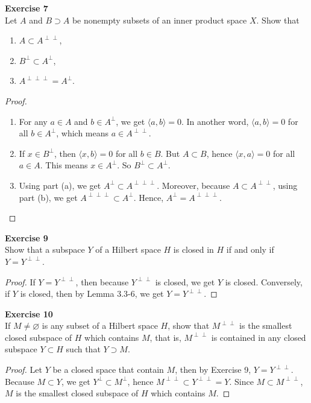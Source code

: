 \documentclass[12pt, a4paper]{article}
\theoremstyle{plain}
\newenvironment{exercise}[2][Exercise]
    { \begin{mdframed}[backgroundcolor=gray!20] \textbf{#1 #2} \\}
    {  \end{mdframed}}
\begin{document}
\begin{exercise}{7}
Let $A$ and $B\supset A$ be nonempty subsets of an inner product space $X$. Show that 
\begin{enumerate}[label=(\alph*)]
\item $A\subset A^{\perp\perp}$,
\item $B^\perp \subset A^\perp$,
\item $A^{\perp\perp\perp}=A^\perp$.
\end{enumerate}
\end{exercise}
	\begin{proof}
	\hfill
	\begin{enumerate}[label=(\alph*)]
	\item For any $a\in A$ and $b\in A^\perp$, we get $\langle{a,b}\rangle = 0$. In another word,  $\langle{a,b}\rangle = 0$ for all $b\in A^\perp$, which means $a\in A^{\perp\perp}$.
	\item If $x\in B^\perp$, then $\langle{x,b}\rangle=0$ for all $b\in B$. But $A\subset B$, hence $\langle{x,a}\rangle=0$ for all $a\in A$. This means $x\in A^\perp$. So $B^\perp\subset A^\perp$.
	\item Using part (a), we get $A^\perp\subset A^{\perp\perp\perp}$. Moreover, because $A\subset A^{\perp\perp}$, using part (b), we get $A^{\perp\perp\perp}\subset A^\perp$. Hence, $A^\perp=A^{\perp\perp\perp}$.
	\end{enumerate}
	\end{proof}
	
\begin{exercise}{9}
Show that a subspace $Y$ of a Hilbert space $H$ is closed in $H$ if and only if $Y=Y^{\perp\perp}$.
\end{exercise}
	\begin{proof}
	If $Y=Y^{\perp\perp}$, then because $Y^{\perp\perp}$ is closed, we get $Y$ is closed. 
	Conversely, if $Y$ is closed, then by Lemma 3.3-6, we get $Y=Y^{\perp\perp}$.
	\end{proof}

\begin{exercise}{10}
If $M\neq \varnothing$ is any subset of a Hilbert space $H$, show that $M^{\perp\perp}$ is the smallest closed subspace of $H$ which contains $M$, that is, $M^{\perp\perp}$ is contained in any closed subspace $Y\subset H$ such that $Y\supset M$.
\end{exercise}
	\begin{proof}
	Let $Y$ be a closed space that contain $M$, then by Exercise 9, $Y=Y^{\perp\perp}$. Because $M\subset Y$, we get $Y^\perp\subset M^\perp$, hence $M^{\perp\perp}\subset Y^{\perp\perp}=Y$. Since $M\subset M^{\perp\perp}$, $M$ is the smallest closed subspace of $H$ which contains $M$.
	\end{proof}
\end{document}
